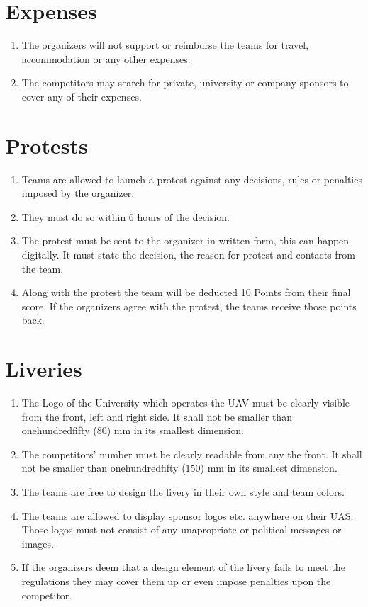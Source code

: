     \section{Expenses}
    \begin{enumerate}
      \item The organizers will not support or reimburse the teams for travel, accommodation or any other expenses. 
      \item The competitors may search for private, university or company sponsors to cover any of their expenses.
    \end{enumerate}

    \section{Protests}
    \begin{enumerate}
      \item Teams are allowed to launch a protest against any decisions, rules or penalties imposed by the organizer.
      \item They must do so within 6 hours of the decision. 
      \item The protest must be sent to the organizer in written form, this can happen digitally. It must state the decision, the reason for protest and contacts from the team.
      \item Along with the protest the team will be deducted 10 Points from their final score. If the organizers agree with the protest, the teams receive those points back. 
    \end{enumerate}

    \section{Liveries}
    \begin{enumerate}
      \item The Logo of the University which operates the UAV must be clearly visible from the front, left and right side. It shall not be smaller than onehundredfifty (80) mm in its smallest dimension.
      \item The competitors' number must be clearly readable from any the front. It shall not be smaller than onehundredfifty (150) mm in its smallest dimension.
      \item The teams are free to design the livery in their own style and team colors. 
      \item The teams are allowed to display sponsor logos etc. anywhere on their UAS. Those logos must not consist of any unapropriate or political messages or images. 
      \item If the organizers deem that a design element of the livery fails to meet the regulations they may cover them up or even impose penalties upon the competitor. 
    \end{enumerate}

